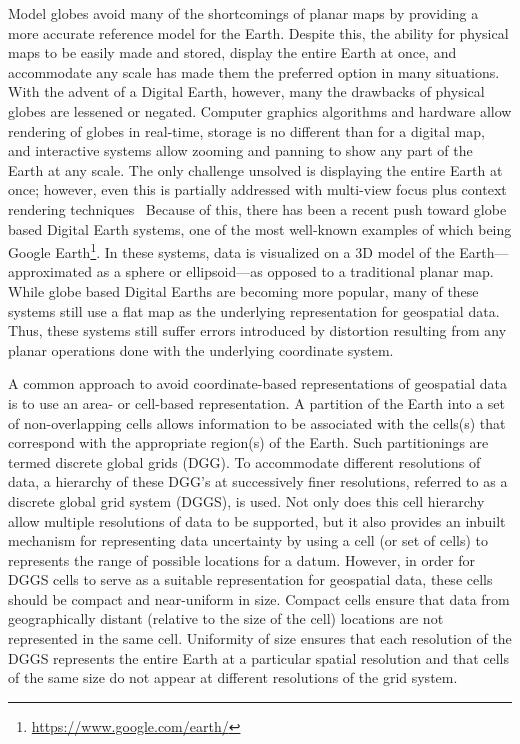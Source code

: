 Model globes avoid many of the shortcomings of planar maps by providing a more accurate reference model for the Earth.
Despite this, the ability for physical maps to be easily made and stored, display the entire Earth at once, and accommodate any scale has made them the preferred option in many situations.
With the advent of a Digital Earth, however, many the drawbacks of physical globes are lessened or negated.
Computer graphics algorithms and hardware allow rendering of globes in real-time, storage is no different than for a digital map, and interactive systems allow zooming and panning to show any part of the Earth at any scale.
The only challenge unsolved is displaying the entire Earth at once; however, even this is partially addressed with multi-view focus plus context rendering techniques~\cite{sherlock2017visualizations}
Because of this, there has been a recent push toward globe based Digital Earth systems, one of the most well-known examples of which being Google Earth\footnote{\url{https://www.google.com/earth/}}.
In these systems, data is visualized on a 3D model of the Earth---approximated as a sphere or ellipsoid---as opposed to a traditional planar map. While globe based Digital Earths are becoming more popular, many of these systems still use a flat map as the underlying representation for geospatial data.
Thus, these systems still suffer errors introduced by distortion resulting from any planar operations done with the underlying coordinate system.


A common approach to avoid coordinate-based representations of geospatial data is to use an area- or cell-based representation.
A partition of the Earth into a set of non-overlapping cells allows information to be associated with the cells(s) that correspond with the appropriate region(s) of the Earth.
Such partitionings are termed discrete global grids (DGG).
To accommodate different resolutions of data, a hierarchy of these DGG's at successively finer resolutions, referred to as a discrete global grid system (DGGS), is used.
Not only does this cell hierarchy allow multiple resolutions of data to be supported, but it also provides an inbuilt mechanism for representing data uncertainty by using a cell (or set of cells) to represents the range of possible locations for a datum.
However, in order for DGGS cells to serve as a suitable representation for geospatial data, these cells should be compact and near-uniform in size.
Compact cells ensure that data from geographically distant (relative to the size of the cell) locations are not represented in the same cell.
Uniformity of size ensures that each resolution of the DGGS represents the entire Earth at a particular spatial resolution and that cells of the same size do not appear at different resolutions of the grid system.


